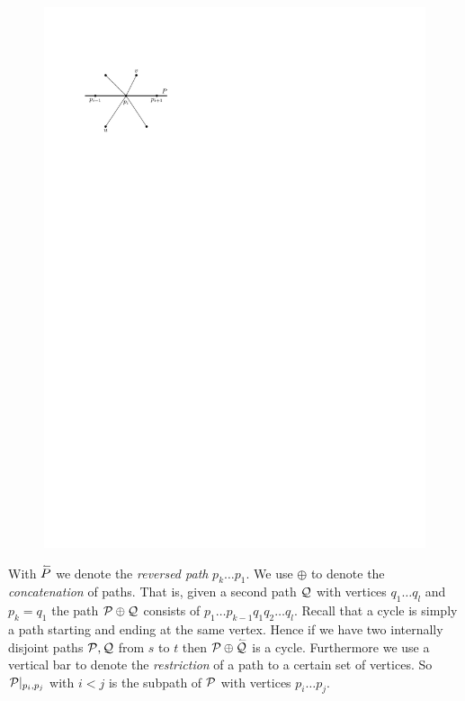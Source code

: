     \begin{figure}[h]
      \centering
      \includegraphics[scale=1]{unifiedAlgo/img/rightNeighbourwalk/rotation}
      \caption{}
      \label{fig:right:rot}
    \end{figure}

    With $\rev{P}$ we denote the \emph{reversed path} $p_k \ldots p_1$. We use $\oplus$ to denote the \emph{concatenation} of paths. That is, given a second path $\Q$ with vertices $q_1 \ldots q_l$ and $p_k = q_1$ the path $\P \oplus \Q$ consists of $p_1 \ldots p_{k-1} q_1 q_2 \ldots q_l$.
    Recall that a cycle is simply a path starting and ending at the same vertex. Hence if we have two  internally disjoint paths $\P, \Q$ from $s$ to $t$ then $\P \oplus \rev{\Q}$ is a cycle.
    Furthermore we use a vertical bar to denote the \emph{restriction} of a path to a certain set of vertices. So $\P|_{p_i, p_j}$ with $i<j$ is the subpath of $\P$ with vertices $p_i \ldots p_j$.

